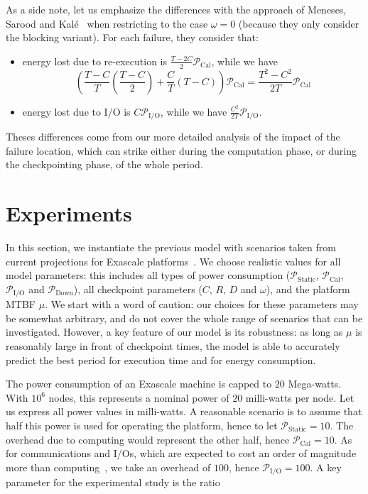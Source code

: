 \documentclass[a4paper]{article}
\newcommand{\ema}[1]{\ensuremath{#1}\xspace}
\newcommand{\ccc}{\ema{C}}
\newcommand{\rrr}{\ema{R}}
\newcommand{\ddd}{\ema{D}}
\newcommand{\period}{T}
\newcommand{\power}[1][]{\ema{\mathcal{P}_{\text{#1}}}}
\newcommand{\pCal}{\power[Cal]}
\newcommand{\pIO}{\power[I/O]}
\newcommand{\pDown}{\power[Down]}
\newcommand{\pIdle}{\power[Static]}
\newcommand{\workduringckpt}{\omega}
\begin{document}
As a side note, let us emphasize the differences with the approach of 
Meneses, Sarood and Kal\'e~\cite{Kale2012} when restricting to the case $\workduringckpt=0$ 
(because they only consider the blocking variant). For each failure, they
consider that:
\begin{itemize}
	\item energy lost due to re-execution is $\frac{\period - 2\ccc }{2}\pCal$, while we have
\[ \left( \frac{\period - \ccc}{\period} \left (\frac{\period - \ccc}{2} \right ) + \frac{\ccc}{\period}  \left ( \period - \ccc \right ) \right) \pCal = \frac{\period^2 - \ccc^2}{2\period}  \pCal \]  \item energy lost due to I/O is $\ccc \pIO$, while we have $\frac{\ccc^2}{2\period}\pIO$.
\end{itemize}
Theses differences come from our more detailed analysis of the impact of the failure location, which can strike
either during the computation phase, or during the checkpointing phase, of the whole period.


\smallskip
\section{Experiments}
\label{sec.experiments}

In this section, we instantiate the previous model with scenarios taken from current projections
for Exascale platforms~\cite{IESP-Exascale,DARPA,Shalf2011,Ferreira2011}. 
We choose realistic values for all model parameters:
this includes all types of power consumption (\pIdle, \pCal, \pIO and \pDown), all checkpoint parameters
(\ccc, \rrr, \ddd and $\workduringckpt$), and the platform MTBF $\mu$.
We start with a word of caution: our choices for these parameters may be somewhat arbitrary, and 
do not cover the whole range of scenarios that can be investigated. 
However, a key feature of our model is its robustness: as long as
$\mu$ is reasonably large in front of checkpoint times, the model is able to accurately predict the 
best period for execution time and for energy consumption.


The power consumption of an Exascale machine is capped to $20$ Mega-watts. With $10^{6}$ nodes,
this represents a nominal power of $20$ milli-watts per node. Let us express all power values in milli-watts.
A reasonable scenario is to assume that half this power is used for operating the platform,
hence to let $\pIdle = 10$. The overhead due to computing would represent the other half, hence
$\pCal = 10$. As for communications and I/Os, which are expected to cost an order of magnitude
more than computing~\cite{Shalf2011}, we take an overhead of $100$, hence $\pIO =100$.
A key parameter for the experimental study is the ratio 
\end{document}
